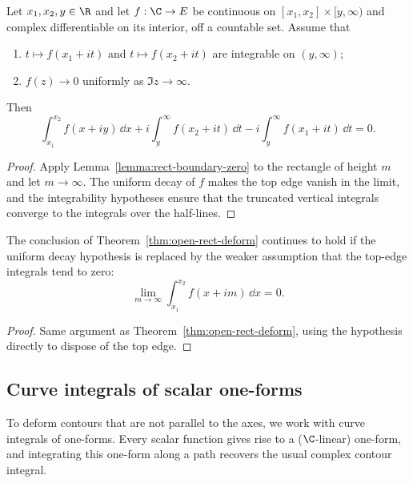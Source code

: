 \begin{theorem}\label{thm:open-rect-deform}\leanok
  Let $x_1, x_2, y \in \R$ and let $f : \C \to E$ be continuous on
  $[x_1, x_2] \times [y, \infty)$ and complex differentiable on its interior, off a countable set.
  Assume that
  \begin{enumerate}
    \item $t \mapsto f(x_1 + it)$ and $t \mapsto f(x_2 + it)$ are integrable on $(y, \infty)$;
    \item $f(z) \to 0$ uniformly as $\Im z \to \infty$.
  \end{enumerate}
  Then
  \[
    \int_{x_1}^{x_2} f(x + iy) \,\dd x
      + i\int_{y}^{\infty} f(x_2 + it) \,\dd t - i\int_{y}^{\infty} f(x_1 + it) \,\dd t = 0.
  \]
\end{theorem}
\begin{proof}\leanok
  Apply Lemma~\ref{lemma:rect-boundary-zero} to the rectangle of height $m$ and let
  $m \to \infty$. The uniform decay of $f$ makes the top edge vanish in the limit, and the
  integrability hypotheses ensure that the truncated vertical integrals converge to the integrals
  over the half-lines.
\end{proof}

\begin{theorem}\label{thm:rect-deform-tendsto-top}\leanok
  The conclusion of Theorem~\ref{thm:open-rect-deform} continues to hold if the uniform decay
  hypothesis is replaced by the weaker assumption that the top-edge integrals tend to zero:
  \[
    \lim_{m \to \infty} \int_{x_1}^{x_2} f(x + im) \,\dd x = 0.
  \]
\end{theorem}
\begin{proof}\leanok
  Same argument as Theorem~\ref{thm:open-rect-deform}, using the hypothesis directly to dispose of
  the top edge.
\end{proof}

\subsection{Curve integrals of scalar one-forms}

To deform contours that are not parallel to the axes, we work with curve integrals of one-forms.
Every scalar function gives rise to a ($\C$-linear) one-form, and integrating this one-form along a
path recovers the usual complex contour integral.

